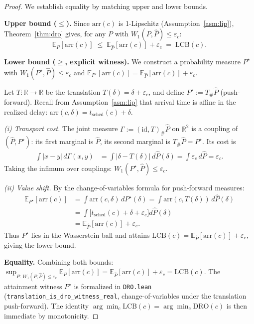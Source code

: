 \documentclass[11pt]{article}
\theoremstyle{definition}
\theoremstyle{remark}
\begin{document}
\begin{proof}
We establish equality by matching upper and lower bounds.

\noindent\textbf{Upper bound ($\leq$).}
Since $\mathrm{arr}(c)$ is 1-Lipschitz (Assumption~\ref{asm:lip}),
Theorem~\ref{thm:dro} gives, for any $P$ with $W_1(P,\hat{P})\leq\varepsilon_c$:
\[
\mathbb{E}_P[\mathrm{arr}(c)]
\;\leq\; \mathbb{E}_{\hat{P}}[\mathrm{arr}(c)] + \varepsilon_c
\;=\; \mathrm{LCB}(c).
\]

\noindent\textbf{Lower bound ($\geq$, explicit witness).}
We construct a probability measure
$P^\star$ with $W_1(P^\star,\hat{P}) \leq \varepsilon_c$ and
$\mathbb{E}_{P^\star}[\mathrm{arr}(c)] = \mathbb{E}_{\hat{P}}[\mathrm{arr}(c)] + \varepsilon_c$.

Let $T:\mathbb{R}\to\mathbb{R}$ be the translation
$T(\delta) = \delta + \varepsilon_c$, and define
$P^\star := T_\#\hat{P}$ (push-forward).
Recall from Assumption~\ref{asm:lip} that arrival time is affine
in the realized delay: $\mathrm{arr}(c,\delta) = t_{\mathrm{sched}}(c) + \delta$.

\emph{(i) Transport cost.}
The joint measure $\Gamma := (\mathrm{id}, T)_\#\hat{P}$ on $\mathbb{R}^2$
is a coupling of $(\hat{P}, P^\star)$: its first marginal is $\hat{P}$,
its second marginal is $T_\#\hat{P} = P^\star$. Its cost is
\begin{align*}
\textstyle\int |x{-}y|\,d\Gamma(x,y)
&= \textstyle\int |\delta - T(\delta)|\,d\hat{P}(\delta)
  = \textstyle\int \varepsilon_c\,d\hat{P}
  = \varepsilon_c.
\end{align*}
Taking the infimum over couplings: $W_1(P^\star, \hat{P}) \leq \varepsilon_c$.

\emph{(ii) Value shift.}
By the change-of-variables formula for push-forward measures:
\begin{align*}
\mathbb{E}_{P^\star}[\mathrm{arr}(c)]
&= \textstyle\int\mathrm{arr}(c,\delta)\,dP^\star(\delta)
  = \textstyle\int\mathrm{arr}(c,T(\delta))\,d\hat{P}(\delta)\\
&= \textstyle\int\bigl[t_{\mathrm{sched}}(c) + \delta + \varepsilon_c\bigr]d\hat{P}(\delta)\\
&= \mathbb{E}_{\hat{P}}[\mathrm{arr}(c)] + \varepsilon_c.
\end{align*}
Thus $P^\star$ lies in the Wasserstein ball and attains
$\mathrm{LCB}(c) = \mathbb{E}_{\hat{P}}[\mathrm{arr}(c)] + \varepsilon_c$,
giving the lower bound.

\noindent\textbf{Equality.}
Combining both bounds:
$\sup_{P:\,W_1(P,\hat{P})\leq\varepsilon_c}\mathbb{E}_P[\mathrm{arr}(c)]
 = \mathbb{E}_{\hat{P}}[\mathrm{arr}(c)] + \varepsilon_c = \mathrm{LCB}(c)$.
The attainment witness $P^\star$ is formalized in
\texttt{DRO.lean} (\texttt{translation\_is\_dro\_witness\_real},
change-of-variables under the translation push-forward).
The identity $\arg\min_c \mathrm{LCB}(c) = \arg\min_c \mathrm{DRO}(c)$
is then immediate by monotonicity.
\end{proof}
\end{document}
